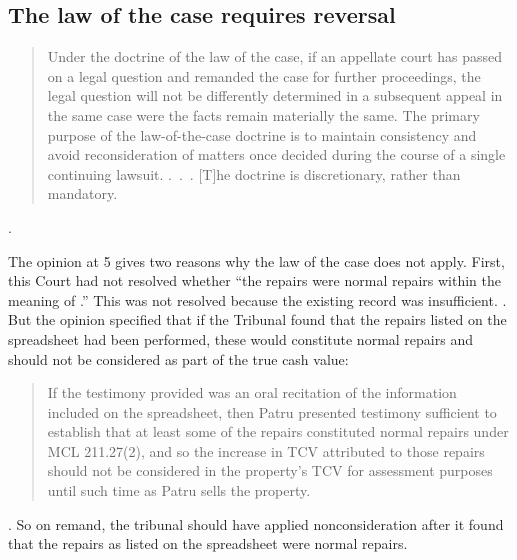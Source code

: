 \documentclass[12pt,\documentclassflag]{michiganCourtOfAppealsBrief}
\begin{document}

\subsection{The law of the case requires reversal}

\begin{quote}
  Under the doctrine of the law of the case, if an appellate court has passed on a legal question and remanded the case for further proceedings, the legal question will not be differently determined in a subsequent appeal in the same case were the facts remain materially the same. The primary purpose of the law-of-the-case doctrine is to maintain consistency and avoid reconsideration of matters once decided during the course of a single  %
  continuing lawsuit. .~.~.  [T]he doctrine is discretionary, rather than mandatory.
\end{quote}
.

The opinion at 5 gives two reasons why the law of the case does not apply. First,
this Court had not resolved whether ``the repairs were normal repairs within the meaning of \mathieuGast.'' This was not resolved because the existing record was insufficient. . But the opinion specified that if the Tribunal found that the repairs listed on the spreadsheet had been performed, these would constitute normal repairs and should not be considered as part of the true cash value:

\begin{quote}
  If the testimony provided was an oral recitation of the
information included on the spreadsheet, then Patru presented testimony sufficient to establish
that at least some of the repairs constituted normal repairs under MCL 211.27(2), and so the
increase in TCV attributed to those repairs should not be considered in the property's TCV for
assessment purposes until such time as Patru sells the property.
\end{quote}
. So on remand, the tribunal should have applied nonconsideration after it found that the repairs as listed on the spreadsheet were normal repairs.



\end{document}

